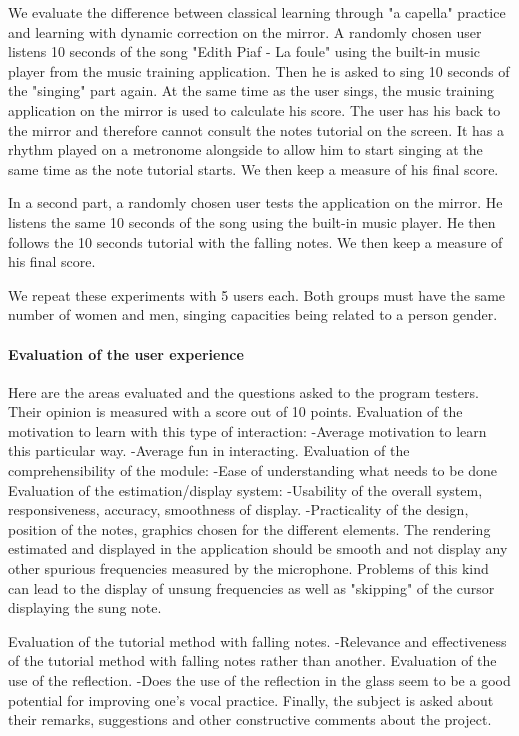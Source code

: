 We evaluate the difference between classical learning through "a capella" practice and learning with dynamic correction on the mirror. A randomly chosen user listens 10 seconds of the song "Edith Piaf - La foule" using the built-in music player from the music training application. Then he is asked to sing 10 seconds of the "singing" part again. At the same time as the user sings, the music training application on the mirror is used to calculate his score. The user has his back to the mirror and therefore cannot consult the notes tutorial on the screen. It has a rhythm played on a metronome alongside to allow him to start singing at the same time as the note tutorial starts.
We then keep a measure of his final score.

In a second part, a randomly chosen user tests the application on the mirror. He listens the same 10 seconds of the song using the built-in music player. He then follows the 10 seconds tutorial with the falling notes.
We then keep a measure of his final score.

We repeat these experiments with 5 users each. Both groups must have the same number of women and men, singing capacities being related to a person gender.

\paragraph{Evaluation of the user experience}

Here are the areas evaluated and the questions asked to the program testers. Their opinion is measured with a score out of 10 points.
Evaluation of the motivation to learn with this type of interaction: -Average motivation to learn this particular way. -Average fun in interacting.
Evaluation of the comprehensibility of the module: -Ease of understanding what needs to be done Evaluation of the estimation/display system: -Usability of the overall system, responsiveness, accuracy, smoothness of display. -Practicality of the design, position of the notes, graphics chosen for the different elements. The rendering estimated and displayed in the application should be smooth and not display any other spurious frequencies measured by the microphone. Problems of this kind can lead to the display of unsung frequencies as well as "skipping" of the cursor displaying the sung note. 

Evaluation of the tutorial method with falling notes. -Relevance and effectiveness of the tutorial method with falling notes rather than another.
Evaluation of the use of the reflection. -Does the use of the reflection in the glass seem to be a good potential for improving one’s vocal practice. Finally, the subject is asked about their remarks, suggestions and other constructive comments about the project.

